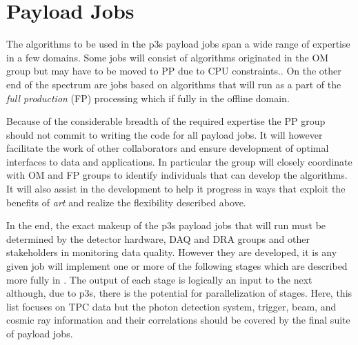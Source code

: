 \documentclass[pdftex,12pt,letter]{article}
\begin{document}
\section{Payload Jobs}
\label{sec:categories}

The algorithms to be used in the p3s payload jobs span a wide
range of expertise in a few domains.  Some jobs will consist of algorithms
originated in the OM group but may have to be moved to PP due
to CPU constraints..
On the other end of the spectrum
are jobs based on algorithms that will run as a part
of the \textit{full production} (FP) processing which if fully in the
offline domain.

Because of the considerable breadth of the required expertise the
PP group should not commit to writing the code for all payload jobs. 
It will however facilitate the work of other
collaborators and ensure development of optimal interfaces
to data and applications.  In particular the group will closely
coordinate with OM and FP groups to identify individuals that can
develop the algorithms.  It will also assist in the development to
help it progress in ways that exploit the benefits of \textit{art} and
realize the flexibility described above.

In the end, the exact makeup of the p3s payload jobs that will run
must be determined by the detector hardware, DAQ and DRA groups and
other stakeholders in monitoring data quality.  However they are
developed, it is any given job will implement one or more of the
following stages which are described more fully in \cite{docdb1811}.
The output of each stage is logically an input to the next although,
due to p3s, there is the potential for parallelization of stages.
Here, this list focuses on TPC data but the photon detection system,
trigger, beam, and cosmic ray information and their correlations
should be covered by the final suite of payload jobs.
\end{document}
